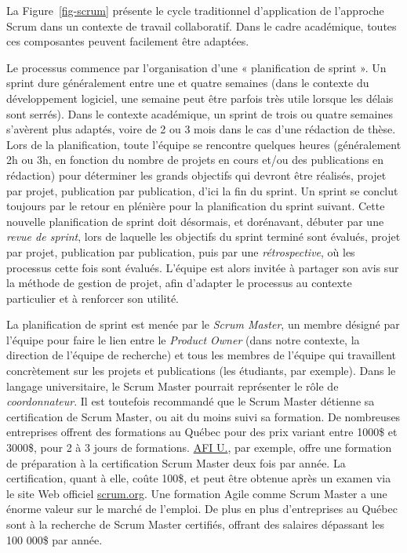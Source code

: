 \documentclass[
  letterpaper,
  DIV=11,
  numbers=noendperiod,
  oneside]{scrreprt}
\begin{document}
La Figure~\ref{fig-scrum} présente le cycle traditionnel d'application
de l'approche Scrum dans un contexte de travail collaboratif. Dans le
cadre académique, toutes ces composantes peuvent facilement être
adaptées.

Le processus commence par l'organisation d'une « planification de sprint
». Un sprint dure généralement entre une et quatre semaines (dans le
contexte du développement logiciel, une semaine peut être parfois très
utile lorsque les délais sont serrés). Dans le contexte académique, un
sprint de trois ou quatre semaines s'avèrent plus adaptés, voire de 2 ou
3 mois dans le cas d'une rédaction de thèse. Lors de la planification,
toute l'équipe se rencontre quelques heures (généralement 2h ou 3h, en
fonction du nombre de projets en cours et/ou des publications en
rédaction) pour déterminer les grands objectifs qui devront être
réalisés, projet par projet, publication par publication, d'ici la fin
du sprint. Un sprint se conclut toujours par le retour en plénière pour
la planification du sprint suivant. Cette nouvelle planification de
sprint doit désormais, et dorénavant, débuter par une \emph{revue de
sprint}, lors de laquelle les objectifs du sprint terminé sont évalués,
projet par projet, publication par publication, puis par une
\emph{rétrospective}, où les processus cette fois sont évalués. L'équipe
est alors invitée à partager son avis sur la méthode de gestion de
projet, afin d'adapter le processus au contexte particulier et à
renforcer son utilité.

La planification de sprint est menée par le \emph{Scrum Master}, un
membre désigné par l'équipe pour faire le lien entre le \emph{Product
Owner} (dans notre contexte, la direction de l'équipe de recherche) et
tous les membres de l'équipe qui travaillent concrètement sur les
projets et publications (les étudiants, par exemple). Dans le langage
universitaire, le Scrum Master pourrait représenter le rôle de
\emph{coordonnateur}. Il est toutefois recommandé que le Scrum Master
détienne sa certification de Scrum Master, ou ait du moins suivi sa
formation. De nombreuses entreprises offrent des formations au Québec
pour des prix variant entre 1000\$ et 3000\$, pour 2 à 3 jours de
formations.
\href{https://www.afiexpertise.com/fr/formation/preparation-a-la-certification-scrum-master-1785}{AFI
U.}, par exemple, offre une formation de préparation à la certification
Scrum Master deux fois par année. La certification, quant à elle, coûte
100\$, et peut être obtenue après un examen via le site Web officiel
\href{https://www.scrum.org/professional-scrum-certifications/professional-scrum-master-assessments}{scrum.org}.
Une formation Agile comme Scrum Master a une énorme valeur sur le marché
de l'emploi. De plus en plus d'entreprises au Québec sont à la recherche
de Scrum Master certifiés, offrant des salaires dépassant les 100 000\$
par année.
\end{document}
